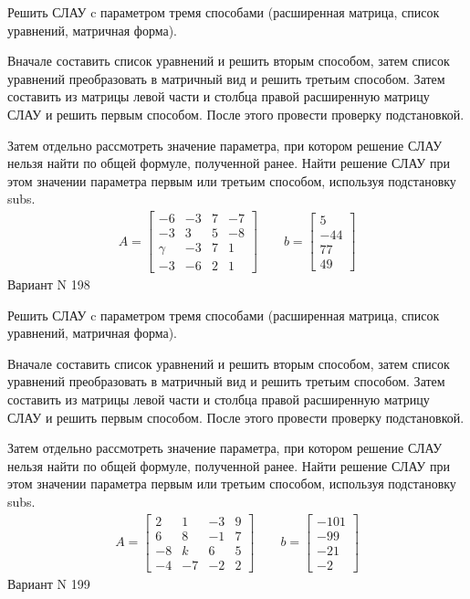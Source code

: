 \documentclass[11pt]{report}
\begin{document}
Решить СЛАУ c параметром тремя способами (расширенная матрица, список уравнений, матричная форма).

Вначале составить список уравнений и решить вторым способом,
затем список уравнений преобразовать в матричный вид и решить третьим способом.
Затем составить из матрицы левой части и столбца правой расширенную матрицу СЛАУ и решить первым способом.
После этого провести проверку подстановкой.

Затем отдельно рассмотреть значение параметра, при котором решение СЛАУ нельзя найти по общей формуле,
полученной ранее.
Найти решение СЛАУ при этом значении параметра первым или третьим способом, используя подстановку subs.
\begin{align*}
    A = \left[\begin{matrix}-6 & -3 & 7 & -7\\-3 & 3 & 5 & -8\\\gamma & -3 & 7 & 1\\-3 & -6 & 2 & 1\end{matrix}\right]
\qquad b = \left[\begin{matrix}5\\-44\\77\\49\end{matrix}\right]
\end{align*}
\newpage
Вариант N 198


Решить СЛАУ c параметром тремя способами (расширенная матрица, список уравнений, матричная форма).

Вначале составить список уравнений и решить вторым способом,
затем список уравнений преобразовать в матричный вид и решить третьим способом.
Затем составить из матрицы левой части и столбца правой расширенную матрицу СЛАУ и решить первым способом.
После этого провести проверку подстановкой.

Затем отдельно рассмотреть значение параметра, при котором решение СЛАУ нельзя найти по общей формуле,
полученной ранее.
Найти решение СЛАУ при этом значении параметра первым или третьим способом, используя подстановку subs.
\begin{align*}
    A = \left[\begin{matrix}2 & 1 & -3 & 9\\6 & 8 & -1 & 7\\-8 & k & 6 & 5\\-4 & -7 & -2 & 2\end{matrix}\right]
\qquad b = \left[\begin{matrix}-101\\-99\\-21\\-2\end{matrix}\right]
\end{align*}
\newpage
Вариант N 199
\end{document}
